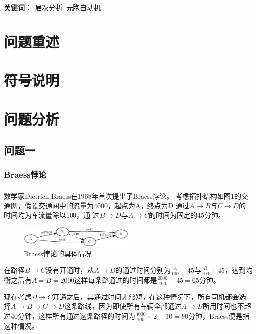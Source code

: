 \documentclass[fontset=windows,a4paper,12pt]{ctexart}
\newcommand{\upcite}[1]{\textsuperscript{\textsuperscript{\cite{#1}}}}
\begin{document}
  \begin{center}
  \end{center}
  \linespread{1.2}
  \begin{center}
  \end{center}
  \textbf{关键词：}\ 层次分析\ 元胞自动机
  
  \section{问题重述}
  \section{符号说明}
  \section{问题分析}
	\subsection{问题一}
		\subsubsection{Braess悖论}
			数学家Dietrich Braess在1968年首次提出了Braess悖论\upcite{Braess1968Ü}。
			考虑拓扑结构如图\ref{fig:braess}的交通网，假设交通网中的流量为4000，起点为A，终点为D
			通过$ A \rightarrow B $与$ C \rightarrow D $的时间均为车流量除以100，通
			过$ B \rightarrow D $与$ A \rightarrow C $的时间为固定的45分钟。
			\begin{figure}[!htbp]
				\centering
				\includegraphics[width=0.5\textwidth]{pic/braess.eps}
				\caption{Braess悖论的具体情况}
				\label{fig:braess}
			\end{figure}
			在路径$ B \rightarrow C $没有开通时，从$ A \rightarrow D $的通过时间分别为$ \frac{A}{100}+45 $与$ \frac{B}
			{100} + 45 $，达到均衡之后有$ A=B=2000 $这样每条路通过的时间都是$ \frac{2000}{100}
			+45=65 $分钟。
			
			现在考虑$ B \rightarrow C $开通之后，其通过时间非常短，在这种情况下，所有司机都会选择$ A \rightarrow B \rightarrow C \rightarrow D $这条路线，因为即使所有车辆全部通过$ A \rightarrow B $所用时间也不超过40分钟，这样所有通过这条路径的时间为$ \frac{4000}{100}\times 2+10=90$分钟，Braess便是指这种情况。
\end{document}
